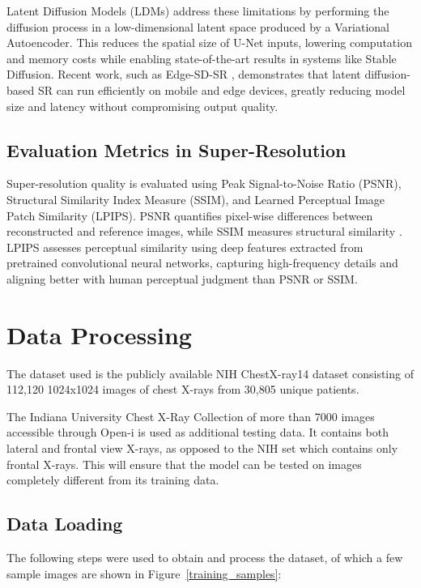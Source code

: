 \documentclass{article} %
\begin{document}
Latent Diffusion Models (LDMs) \citep{rombach2022latent} address these limitations by performing the diffusion process in a low-dimensional latent space produced by a Variational Autoencoder. This reduces the spatial size of U-Net inputs, lowering computation and memory costs while enabling state-of-the-art results in systems like Stable Diffusion. Recent work, such as Edge-SD-SR \citep{mehdi2025edgesd}, demonstrates that latent diffusion-based SR can run efficiently on mobile and edge devices, greatly reducing model size and latency without compromising output quality.

\subsection{Evaluation Metrics in Super-Resolution}

Super-resolution quality is evaluated using Peak Signal-to-Noise Ratio (PSNR), Structural Similarity Index Measure (SSIM), and Learned Perceptual Image Patch Similarity (LPIPS). PSNR quantifies pixel-wise differences between reconstructed and reference images, while SSIM measures structural similarity \citep{huynh2008scope, wang2004image}. LPIPS \citep{zhang2018lpips} assesses perceptual similarity using deep features extracted from pretrained convolutional neural networks, capturing high-frequency details and aligning better with human perceptual judgment than PSNR or SSIM. 

\section{Data Processing}

The dataset used is the publicly available NIH ChestX-ray14 dataset \citep{wang17} consisting of 112,120 1024x1024 images of chest X-rays from 30,805 unique patients.

The Indiana University Chest X-Ray Collection of more than 7000 images accessible through Open-i \citep{demner2016} is used as additional testing data. It contains both lateral and frontal view X-rays, as opposed to the NIH set which contains only frontal X-rays. This will ensure that the model can be tested on images completely different from its training data.

\subsection{Data Loading}

The following steps were used to obtain and process the dataset, of which a few sample images are shown in Figure~\ref{training_samples}:
\end{document}
